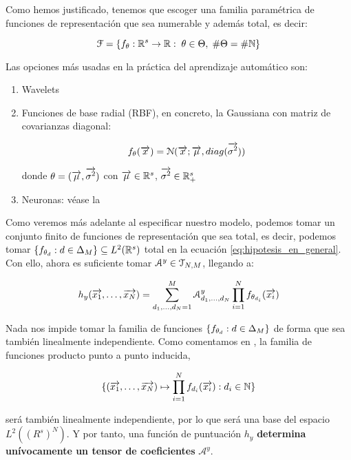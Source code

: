 Como hemos justificado, tenemos que escoger una familia paramétrica de funciones de representación que sea numerable y además total, es decir:

\begin{equation}
	\mathcal{F} = \{  f_{\theta}: \mathbb{R}^s \to \mathbb{R}: \; \theta \in \Theta, \; \# \Theta = \# \mathbb{N}  \}
\end{equation}

Las opciones más usadas en la práctica del aprendizaje automático son:

\begin{enumerate}
	\item Wavelets
	\item Funciones de base radial (RBF), en concreto, la Gaussiana con matriz de covarianzas diagonal:

	      \begin{equation}
		      f_\theta(\overrightarrow{x}) = \mathcal{N}(\overrightarrow{x}; \overrightarrow{\mu}, diag(\overrightarrow{\sigma^2}))
	      \end{equation}

	      donde $\theta = (\overrightarrow{\mu}, \overrightarrow{\sigma^2})$ con $\overrightarrow{\mu} \in \mathbb{R}^s$, $\overrightarrow{\sigma^2} \in \mathbb{R}^s_+$

    \item Neuronas: véase la 


\end{enumerate}

Como veremos más adelante al especificar nuestro modelo, podemos tomar un conjunto finito de funciones de representación que sea total, es decir, podemos tomar $\{f_{\theta_d}: d \in \Delta_{M}\} \subseteq L^2(\mathbb{R}^s)$ total en la ecuación \eqref{eq:hipotesis_en_general}. Con ello, ahora es suficiente tomar $\mathcal{A}^y \in \mathcal{T}_{N, M}$, llegando a:

\begin{equation}
	h_y(\overrightarrow{x_1}, \ldots, \overrightarrow{x_N}) = \sum_{d_1, \ldots, d_N = 1}^{M} \mathcal{A}^y_{d_1, \ldots, d_N} \prod_{i = 1}^N f_{\theta_{d_i}}(\overrightarrow{x_i})
\end{equation}

\begin{observacion}

	Nada nos impide tomar la familia de funciones $\{f_{\theta_d}: d \in \Delta_{M}\}$ de forma que sea también linealmente independiente. Como comentamos en , la familia de funciones producto punto a punto inducida,

	\begin{equation}
		\{ (\overrightarrow{x_1}, \ldots, \overrightarrow{x_N}) \mapsto \prod_{i = 1}^N f_{d_i}(\overrightarrow{x_i}): d_i \in \mathbb{N} \}
	\end{equation}

	será también linealmente independiente, por lo que será una base del espacio $L^2((R^s)^N)$. Y por tanto, una función de puntuación $h_y$ \textbf{determina unívocamente un tensor de coeficientes} $\mathcal{A}^y$.

\end{observacion}

